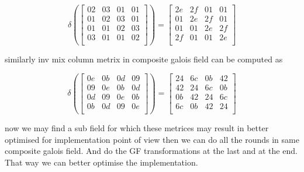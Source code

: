 \documentclass[10pt, conference, compsocconf]{IEEEtran}
\begin{document}
\begin{equation}
\delta \left(\left[ \begin{array}{cccccccc}
02 & 03 & 01 & 01\\
01 & 02 & 03 & 01\\
01 & 01 & 02 & 03\\
03 & 01 & 01 & 02\\
 \end{array} \right]\right) = \left[ \begin{array}{cccccccc}
2e & 2f & 01 & 01\\
01 & 2e & 2f & 01\\
01 & 01 & 2e & 2f\\
2f & 01 & 01 & 2e\\
 \end{array} \right]
\end{equation}


similarly inv mix column metrix in composite galois field can be computed as


\begin{equation}
\delta \left(\left[ \begin{array}{cccccccc}
0e & 0b & 0d & 09\\
09 & 0e & 0b & 0d\\
0d & 09 & 0e & 0b\\
0b & 0d & 09 & 0e\\
 \end{array} \right]\right) = \left[ \begin{array}{cccccccc}
24 & 6c & 0b & 42\\
42 & 24 & 6c & 0b\\
0b & 42 & 24 & 6c\\
6c & 0b & 42 & 24\\
 \end{array} \right]
\end{equation}

now we may find a sub field for which these metrices may result in better optimised for implementation point of view then we can do all the rounds in same composite galois field. And do the GF transformations at the last and at the end. That way we can better optimise the implementation.



\end{document}
